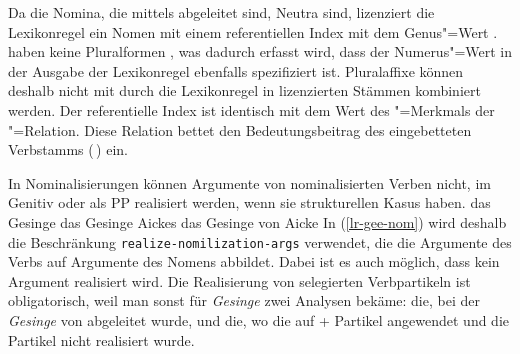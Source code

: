 Da die Nomina, die mittels \geen abgeleitet sind, Neutra sind, lizenziert
die Lexikonregel ein Nomen mit einem referentiellen Index mit dem Genus"=Wert .
\geenen haben keine Pluralformen \citep[]{Bierwisch89a}, was dadurch
erfasst wird, dass der Numerus"=Wert in der Ausgabe der Lexikonregel ebenfalls
spezifiziert ist. Pluralaffixe können deshalb nicht mit durch die Lexikonregel
in   lizenzierten Stämmen kombiniert werden. 
Der referentielle Index  ist identisch mit dem Wert des \argzero"=Merkmals
der "=Relation. Diese Relation bettet den Bedeutungsbeitrag des
eingebetteten Verbstamms (\ltop {}\,) ein.

In Nominalisierungen können Argumente von nominalisierten Verben nicht, im Genitiv oder als PP realisiert werden, wenn
sie strukturellen Kasus haben.
\eal
\ex das Gesinge
\ex das Gesinge Aickes
\ex das Gesinge von Aicke
\zl
In (\ref{lr-gee-nom}) wird deshalb die Beschränkung \texttt{realize-nomilization-args} verwendet,
die die Argumente des Verbs auf Argumente des Nomens abbildet. Dabei ist es auch möglich, dass kein
Argument realisiert wird. Die Realisierung von selegierten Verbpartikeln ist obligatorisch, weil man
sonst für \emph{Gesinge} zwei Analysen bekäme: die, bei der \emph{Gesinge} von 
abgeleitet wurde, und die, wo die \geen auf  + Partikel angewendet und die Partikel nicht
realisiert wurde.



